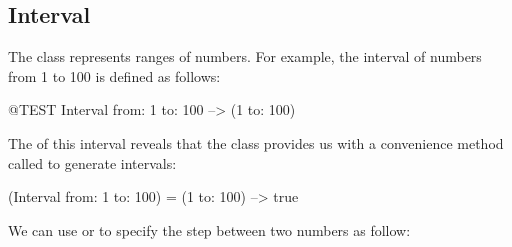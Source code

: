 \documentclass[a4paper,10pt,twoside]{book}
\begin{document}





\subsection{Interval}
The class  represents ranges of numbers.
For example, the interval of numbers from 1 to 100 is defined as follows:
\begin{code}{@TEST}
Interval from: 1 to: 100 --> (1 to: 100)
\end{code}

\noindent
The  of this interval reveals that the class  provides us with a convenience method called  to generate intervals:

\begin{code}{}
(Interval from: 1 to: 100) = (1 to: 100) --> true
\end{code}

We can use  or  to specify the step between two numbers as follow:
\end{document}
